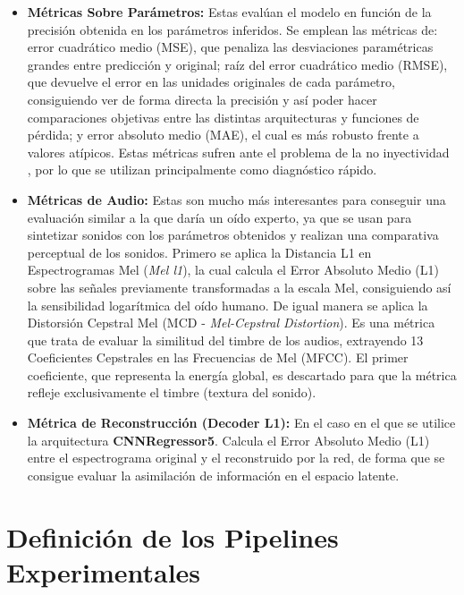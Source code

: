 \begin{itemize}

\item \textbf{Métricas Sobre Parámetros: } Estas evalúan el modelo en función de la precisión obtenida
en los parámetros inferidos. Se emplean las métricas de: error cuadrático medio (MSE), que penaliza las desviaciones paramétricas grandes 
entre predicción y original; raíz del error cuadrático medio (RMSE), que devuelve el error en las unidades originales de cada parámetro, consiguiendo
ver de forma directa la precisión y así poder hacer comparaciones objetivas entre las distintas arquitecturas y funciones de pérdida;
y error absoluto medio (MAE), el cual es más robusto frente a valores atípicos. Estas métricas sufren ante el problema de la no inyectividad 
, por lo que se utilizan principalmente como diagnóstico rápido.

\item \textbf{Métricas de Audio: } Estas son mucho más interesantes para conseguir una evaluación
similar a la que daría un oído experto, ya que se usan para sintetizar sonidos con los parámetros obtenidos y realizan una comparativa
perceptual de los sonidos. Primero se aplica la Distancia L1 en Espectrogramas Mel (\textit{Mel l1}), la cual calcula el 
Error Absoluto Medio (L1) sobre las señales previamente transformadas a la escala Mel, consiguiendo así la sensibilidad logarítmica
del oído humano. De igual manera se aplica la Distorsión Cepstral Mel (MCD - \textit{Mel-Cepstral Distortion}). Es una métrica que trata 
de evaluar la similitud del timbre de los audios, extrayendo 13 Coeficientes Cepstrales en las Frecuencias de Mel (MFCC). 
El primer coeficiente, que representa la energía global, es descartado para que la métrica refleje exclusivamente el timbre (textura del sonido).

\item \textbf{Métrica de Reconstrucción (Decoder L1): } En el caso en el que se utilice la arquitectura
\textbf{CNNRegressor5}. Calcula el Error Absoluto Medio (L1) entre el espectrograma original y el reconstruido por la red,
de forma que se consigue evaluar la asimilación de información en el espacio latente. 

\end{itemize} 

\section{Definición de los Pipelines Experimentales}

